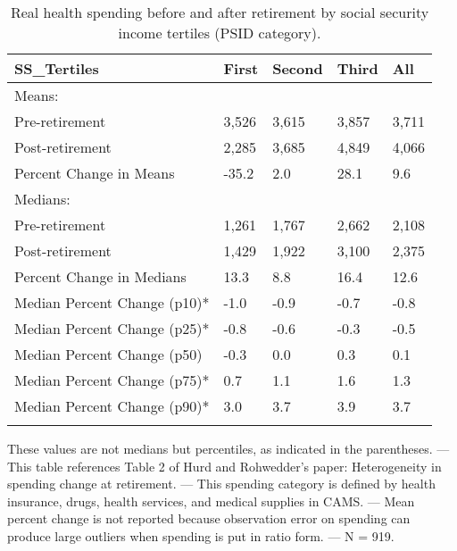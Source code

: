\begin{table}[tbp] \centering
{}

\caption{Real health spending before and after retirement by social security income tertiles (PSID category).}
\begin{tabularx}{\textwidth}{lCCCC}

\toprule
{SS\_Tertiles}&{First}&{Second}&{Third}&{All} \tabularnewline
\midrule\addlinespace[1.5ex]
Means:&&&& \tabularnewline
\midrule Pre-retirement&3,526&3,615&3,857&3,711 \tabularnewline
Post-retirement&2,285&3,685&4,849&4,066 \tabularnewline
Percent Change in Means&-35.2&2.0&28.1&9.6 \tabularnewline
\midrule Medians:&&&& \tabularnewline
\midrule Pre-retirement&1,261&1,767&2,662&2,108 \tabularnewline
Post-retirement&1,429&1,922&3,100&2,375 \tabularnewline
Percent Change in Medians&13.3&8.8&16.4&12.6 \tabularnewline
Median Percent Change (p10)*&-1.0&-0.9&-0.7&-0.8 \tabularnewline
Median Percent Change (p25)*&-0.8&-0.6&-0.3&-0.5 \tabularnewline
Median Percent Change (p50)&-0.3&0.0&0.3&0.1 \tabularnewline
Median Percent Change (p75)*&0.7&1.1&1.6&1.3 \tabularnewline
Median Percent Change (p90)*&3.0&3.7&3.9&3.7 \tabularnewline
\bottomrule \addlinespace[1.5ex]

\end{tabularx}
\begin{flushleft}
\footnotesize *These values are not medians but percentiles, as indicated in the parentheses. \linebreak --- \linebreak This table references Table 2 of Hurd and Rohwedder's paper: Heterogeneity in spending change at retirement. \linebreak --- \linebreak This spending category is defined by health insurance, drugs, health services, and medical supplies in CAMS. \linebreak --- \linebreak Mean percent change is not reported because observation error on spending can produce large outliers when spending is put in ratio form. \linebreak --- \linebreak N = 919.
\end{flushleft}
\end{table}
